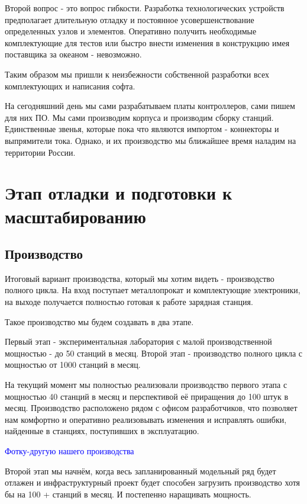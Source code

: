 \documentclass[a4paper,12pt]{report}
\begin{document}
Второй вопрос - это вопрос гибкости. Разработка технологических устройств предполагает длительную отладку и постоянное усовершенствование определенных узлов и элементов. Оперативно получить необходимые комплектующие для тестов или быстро внести изменения в конструкцию имея поставщика за океаном - невозможно.

Таким образом мы пришли к неизбежности собственной разработки всех комплектующих и написания софта. 

На сегодняшний день мы сами разрабатываем платы контроллеров, сами пишем для них ПО. Мы сами производим корпуса и производим сборку станций. Единственные звенья, которые пока что являются импортом - коннекторы и выпрямители тока. Однако, и их производство мы ближайшее время наладим на территории России. 

\section{Этап отладки и подготовки к масштабированию}

\subsection{Производство} 

Итоговый вариант производства, который мы хотим видеть - производство полного цикла. На вход поступает металлопрокат и комплектующие электроники, на выходе получается полностью готовая к работе зарядная станция. 

Такое производство мы будем создавать в два этапе. 

Первый этап - экспериментальная лаборатория с малой производственной мощностью - до 50 станций в месяц. 
Второй этап - производство полного цикла с мощностью от 1000 станций в месяц. 

На текущий момент мы полностью реализовали производство первого этапа с мощностью 40 станций в месяц и перспективой её приращения до 100 штук в месяц. Производство расположено рядом с офисом разработчиков, что позволяет нам комфортно и оперативно реализовывать изменения и исправлять ошибки, найденные в станциях, поступивших в эксплуатацию.

\textcolor{blue}{Фотку-другую нашего производства}

Второй этап мы начнём, когда весь запланированный модельный ряд будет отлажен и инфраструктурный проект будет способен загрузить производство хотя бы на 100 + станций в месяц. И постепенно наращивать мощность.
\end{document}
